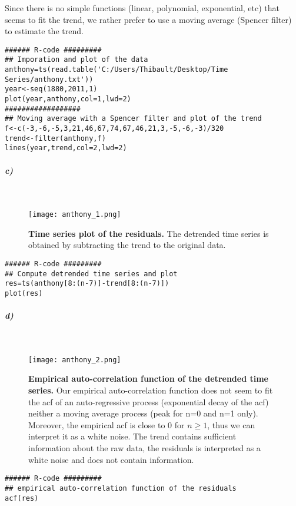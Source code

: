 \documentclass{article}
\begin{document}
Since there is no simple functions (linear, polynomial, exponential, etc) that seems to fit the trend, we rather prefer to use a moving average (Spencer filter) to estimate the trend.
\begin{footnotesize}
\begin{verbatim}
###### R-code #########
## Imporation and plot of the data
anthony=ts(read.table('C:/Users/Thibault/Desktop/Time Series/anthony.txt'))
year<-seq(1880,2011,1)
plot(year,anthony,col=1,lwd=2)
##################
## Moving average with a Spencer filter and plot of the trend
f<-c(-3,-6,-5,3,21,46,67,74,67,46,21,3,-5,-6,-3)/320
trend<-filter(anthony,f)
lines(year,trend,col=2,lwd=2)
\end{verbatim} 
\end{footnotesize}
\subparagraph{c)}
\
\begin{figure}[H]
	\centering
  	\texttt{[image: anthony\_1.png]}
  	\caption{\textbf{Time series plot of the residuals.} The detrended time series is obtained by subtracting the trend to the original data. }
\end{figure}
\begin{footnotesize}
\begin{verbatim}
###### R-code #########
## Compute detrended time series and plot
res=ts(anthony[8:(n-7)]-trend[8:(n-7)])
plot(res)
\end{verbatim} 
\end{footnotesize}

\subparagraph{d)}
\
\begin{figure}[H]
	\centering
  	\texttt{[image: anthony\_2.png]}
  	\caption{\textbf{Empirical auto-correlation function of the detrended time series.} Our empirical auto-correlation function does not seem to fit the acf of an auto-regressive process (exponential decay of the acf) neither a moving average process (peak for n=0 and n=1 only). Moreover, the empirical acf is close to $0$ for $n \geq 1$, thus we can interpret it as a white noise. The trend contains sufficient information about the raw data, the residuals is interpreted as a white noise and does not contain information. }
\end{figure}
\begin{footnotesize}
\begin{verbatim}
###### R-code #########
## empirical auto-correlation function of the residuals
acf(res)
\end{verbatim} 
\end{footnotesize}
\end{document}

